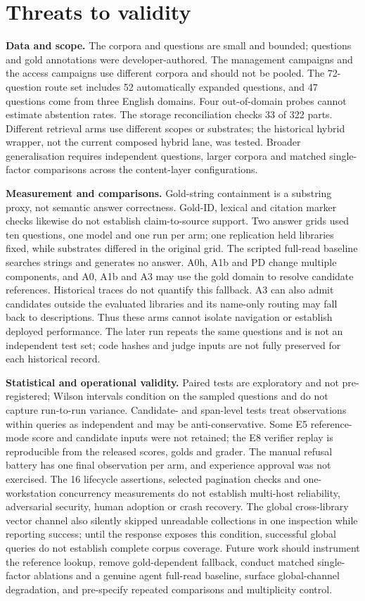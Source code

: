 \section{Threats to validity}
\label{sec:threats}

\noindent\textbf{Data and scope.} The corpora and questions are small and
bounded; questions and gold annotations were developer-authored. The
management campaigns and the access campaigns use different corpora and
should not be pooled. The 72-question route set includes 52 automatically
expanded questions, and 47 questions come from three English domains. Four
out-of-domain probes cannot estimate abstention rates. The storage
reconciliation checks 33 of 322 parts. Different retrieval arms use different
scopes or substrates; the historical hybrid wrapper, not the current composed
hybrid lane, was tested. Broader generalisation requires independent questions,
larger corpora and matched single-factor comparisons across the content-layer
configurations.

\noindent\textbf{Measurement and comparisons.} Gold-string containment is a
substring proxy, not semantic answer correctness. Gold-ID, lexical and citation
marker checks likewise do not establish claim-to-source support. Two answer
grids used ten questions, one model and one run per arm; one replication held
libraries fixed, while substrates differed in the original grid. The scripted
full-read baseline searches strings and generates no answer. A0h, A1b and PD
change multiple components, and A0, A1b and A3 may use the gold domain to
resolve candidate references. Historical traces do not quantify this fallback.
A3 can also admit candidates outside the evaluated libraries and its
name-only routing may fall back to descriptions. Thus these arms cannot isolate
navigation or establish deployed performance. The later run repeats the same
questions and is not an independent test set; code hashes and judge inputs are
not fully preserved for each historical record.

\noindent\textbf{Statistical and operational validity.} Paired tests are
exploratory and not pre-registered; Wilson intervals condition on the sampled
questions and do not capture run-to-run variance. Candidate- and span-level
tests treat observations within queries as independent and may be
anti-conservative. Some E5 reference-mode score and candidate inputs were not retained; the E8
verifier replay is reproducible from the released scores, golds and grader.
The manual refusal battery has one final observation per arm, and experience
approval was not exercised. The 16 lifecycle assertions, selected pagination
checks and one-workstation concurrency measurements do not establish multi-host
reliability, adversarial security, human adoption or crash recovery. The global
cross-library vector channel also silently skipped unreadable collections in
one inspection while reporting success; until the response exposes this
condition, successful global queries do not establish complete corpus coverage.
Future work should instrument the reference lookup, remove gold-dependent
fallback, conduct matched single-factor ablations and a genuine agent full-read
baseline, surface global-channel degradation, and pre-specify repeated
comparisons and multiplicity control.
